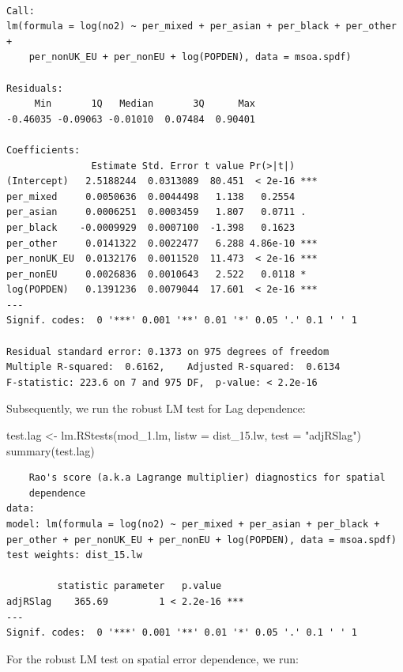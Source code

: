 \documentclass[
  letterpaper,
  DIV=11,
  numbers=noendperiod]{scrreprt}
\newenvironment{Shaded}{\begin{snugshade}}{\end{snugshade}}
\newcommand{\AttributeTok}[1]{\textcolor[rgb]{0.40,0.45,0.13}{#1}}
\newcommand{\FunctionTok}[1]{\textcolor[rgb]{0.28,0.35,0.67}{#1}}
\newcommand{\NormalTok}[1]{\textcolor[rgb]{0.00,0.23,0.31}{#1}}
\newcommand{\OtherTok}[1]{\textcolor[rgb]{0.00,0.23,0.31}{#1}}
\newcommand{\StringTok}[1]{\textcolor[rgb]{0.13,0.47,0.30}{#1}}
\begin{document}
\begin{verbatim}

Call:
lm(formula = log(no2) ~ per_mixed + per_asian + per_black + per_other + 
    per_nonUK_EU + per_nonEU + log(POPDEN), data = msoa.spdf)

Residuals:
     Min       1Q   Median       3Q      Max 
-0.46035 -0.09063 -0.01010  0.07484  0.90401 

Coefficients:
               Estimate Std. Error t value Pr(>|t|)    
(Intercept)   2.5188244  0.0313089  80.451  < 2e-16 ***
per_mixed     0.0050636  0.0044498   1.138   0.2554    
per_asian     0.0006251  0.0003459   1.807   0.0711 .  
per_black    -0.0009929  0.0007100  -1.398   0.1623    
per_other     0.0141322  0.0022477   6.288 4.86e-10 ***
per_nonUK_EU  0.0132176  0.0011520  11.473  < 2e-16 ***
per_nonEU     0.0026836  0.0010643   2.522   0.0118 *  
log(POPDEN)   0.1391236  0.0079044  17.601  < 2e-16 ***
---
Signif. codes:  0 '***' 0.001 '**' 0.01 '*' 0.05 '.' 0.1 ' ' 1

Residual standard error: 0.1373 on 975 degrees of freedom
Multiple R-squared:  0.6162,    Adjusted R-squared:  0.6134 
F-statistic: 223.6 on 7 and 975 DF,  p-value: < 2.2e-16
\end{verbatim}

Subsequently, we run the robust LM test for Lag dependence:

\begin{Shaded}
\begin{Highlighting}[]
\NormalTok{test.lag }\OtherTok{\textless{}{-}} \FunctionTok{lm.RStests}\NormalTok{(mod\_1.lm, }
                       \AttributeTok{listw =}\NormalTok{ dist\_15.lw, }
                       \AttributeTok{test =} \StringTok{"adjRSlag"}\NormalTok{)}
\FunctionTok{summary}\NormalTok{(test.lag)}
\end{Highlighting}
\end{Shaded}

\begin{verbatim}
    Rao's score (a.k.a Lagrange multiplier) diagnostics for spatial
    dependence
data:  
model: lm(formula = log(no2) ~ per_mixed + per_asian + per_black +
per_other + per_nonUK_EU + per_nonEU + log(POPDEN), data = msoa.spdf)
test weights: dist_15.lw
 
         statistic parameter   p.value    
adjRSlag    365.69         1 < 2.2e-16 ***
---
Signif. codes:  0 '***' 0.001 '**' 0.01 '*' 0.05 '.' 0.1 ' ' 1
\end{verbatim}

For the robust LM test on spatial error dependence, we run:
\end{document}
